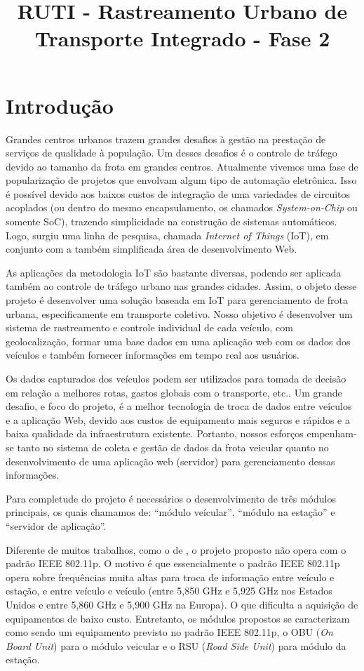 \documentclass[12pt]{uftpibic}
\title{RUTI - Rastreamento Urbano de Transporte Integrado - Fase 2}
\author{}{}
\begin{document}
\maketitle

\chapter{Introdução}

Grandes centros urbanos trazem grandes desafios à gestão na prestação de serviços de qualidade à população. Um desses desafios é o controle de tráfego devido ao tamanho da frota em grandes centros. Atualmente vivemos uma fase de popularização de projetos que envolvam algum tipo de automação eletrônica. Isso é possível devido aos baixos custos de integração de uma variedades de circuitos acoplados (ou dentro do mesmo encapsulamento, os chamados \textit{System-on-Chip} ou somente SoC), trazendo simplicidade na construção de sistemas automáticos. Logo, surgiu uma linha de pesquisa, chamada \textit{Internet of Things} (IoT), em conjunto com a também simplificada área de desenvolvimento Web. 

As aplicações da metodologia IoT são bastante diversas, podendo ser aplicada também ao controle de tráfego urbano nas grandes cidades. Assim, o objeto desse projeto é desenvolver uma solução baseada em IoT para gerenciamento de frota urbana, especificamente em transporte coletivo. Nosso objetivo é desenvolver um sistema de rastreamento e controle individual de cada veículo, com geolocalização, formar uma base dados em uma aplicação web com os dados dos veículos e também fornecer informações em tempo real aos usuários. 

Os dados capturados dos veículos podem ser utilizados para tomada de decisão em relação a melhores rotas, gastos globais com o transporte, etc.. Um grande desafio, e foco do projeto, é a melhor tecnologia de troca de dados entre veículos e a aplicação Web, devido aos custos de equipamento mais seguros e rápidos e a baixa qualidade da infraestrutura existente. Portanto, nossos esforços empenham-se tanto no sistema de coleta e gestão de dados da frota veicular quanto no desenvolvimento de uma aplicação web (servidor) para gerenciamento dessas informações.

Para completude do projeto é necessários o desenvolvimento de três módulos principais, os quais chamamos de: ``módulo veícular'', ``módulo na estação'' e ``servidor de aplicação''.

Diferente de muitos trabalhos, como o de , o projeto proposto não opera com o padrão IEEE 802.11p. O motivo é que essencialmente o padrão IEEE 802.11p opera sobre frequências muita altas para troca de informação entre veículo e estação, e entre veículo e veículo (entre 5,850 GHz e 5,925 GHz nos Estados Unidos e entre 5,860 GHz e 5,900 GHz na Europa). O que dificulta a aquisição de equipamentos de baixo custo. Entretanto, os módulos propostos se caracterizam como sendo um equipamento previsto no padrão IEEE 802.11p, o OBU (\textit{On Board Unit}) para o módulo veicular e o RSU (\textit{Road Side Unit}) para módulo da estação.
\end{document}

